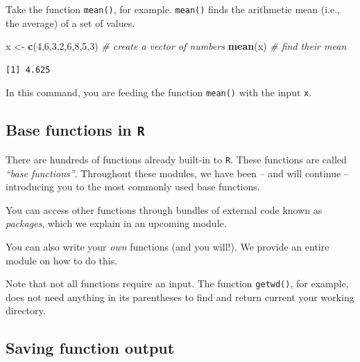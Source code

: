 \documentclass[
]{book}
\newenvironment{Shaded}{\begin{snugshade}}{\end{snugshade}}
\newcommand{\CommentTok}[1]{\textcolor[rgb]{0.56,0.35,0.01}{\textit{#1}}}
\newcommand{\DecValTok}[1]{\textcolor[rgb]{0.00,0.00,0.81}{#1}}
\newcommand{\KeywordTok}[1]{\textcolor[rgb]{0.13,0.29,0.53}{\textbf{#1}}}
\newcommand{\NormalTok}[1]{#1}
\newcommand{\StringTok}[1]{\textcolor[rgb]{0.31,0.60,0.02}{#1}}
\begin{document}
Take the function \texttt{mean()}, for example. \texttt{mean()} finds the arithmetic mean (i.e., the average) of a set of values.

\begin{Shaded}
\begin{Highlighting}[]
\NormalTok{x <-}\StringTok{ }\KeywordTok{c}\NormalTok{(}\DecValTok{4}\NormalTok{,}\DecValTok{6}\NormalTok{,}\DecValTok{3}\NormalTok{,}\DecValTok{2}\NormalTok{,}\DecValTok{6}\NormalTok{,}\DecValTok{8}\NormalTok{,}\DecValTok{5}\NormalTok{,}\DecValTok{3}\NormalTok{) }\CommentTok{# create a vector of numbers}
\KeywordTok{mean}\NormalTok{(x) }\CommentTok{# find their mean}
\end{Highlighting}
\end{Shaded}

\begin{verbatim}
[1] 4.625
\end{verbatim}

In this command, you are feeding the function \texttt{mean()} with the input \texttt{x}.

\hypertarget{base-functions-in-r}{%
\subsection*{\texorpdfstring{Base functions in \texttt{R}}{Base functions in R}}\label{base-functions-in-r}}

There are hundreds of functions already built-in to \texttt{R}. These functions are called \emph{``base functions''}. Throughout these modules, we have been -- and will continue -- introducing you to the most commonly used base functions.

You can access other functions through bundles of external code known as \emph{packages}, which we explain in an upcoming module.

You can also write your \emph{own} functions (and you will!). We provide an entire module on how to do this.

Note that not all functions require an input. The function \texttt{getwd()}, for example, does not need anything in its parentheses to find and return current your working directory.

\hypertarget{saving-function-output}{%
\subsection*{Saving function output}\label{saving-function-output}}
\end{document}
